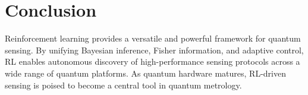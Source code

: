 \documentclass[
    aps,
    prx,
    reprint,
    superscriptaddress,
    amsmath,
    amssymb,
    longbibliography
]{revtex4-2}
\begin{document}
\section{Conclusion}

Reinforcement learning provides a versatile and powerful framework for
quantum sensing. By unifying Bayesian inference, Fisher information, and
adaptive control, RL enables autonomous discovery of high-performance
sensing protocols across a wide range of quantum platforms. As quantum
hardware matures, RL-driven sensing is poised to become a central tool
in quantum metrology.


\end{document}
